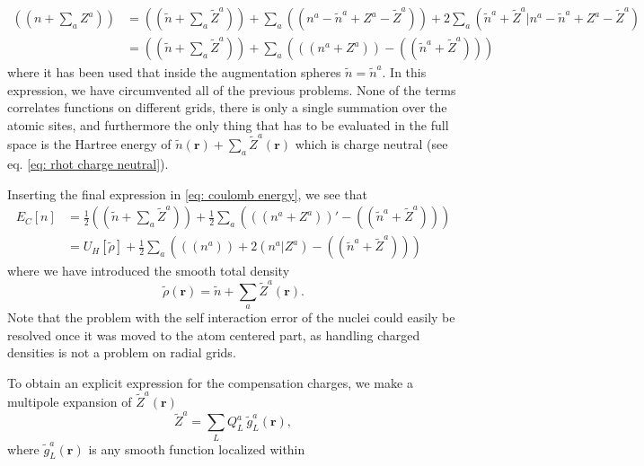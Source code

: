 \documentclass[a4paper]{article}
\newcommand{\s}[1]{\tilde{#1}}
\newcommand{\br}{\mathbf{r}}
\begin{document}
%
\begin{align*}
  ((n+\textstyle\sum_a Z^a)) %
  &= ((\s{n} + \textstyle\sum_a \s{Z}^a)) + \sum_{a}((n^a - \s{n}^a + Z^a - \s{Z}^a)) + 2\sum_a(\s{n}^a+\s{Z}^a|n^a - \s{n}^a + Z^a - \s{Z}^a)\\
  &= ((\s{n} + \textstyle\sum_a \s{Z}^a)) + \sum_{a}\left( ((n^a + Z^a)) - ((\s{n}^a + \s{Z}^a)) \right)
\end{align*}
%
where it has been used that inside the augmentation spheres $\s{n} =
\s{n}^a$. In this expression, we have circumvented all of the previous
problems. None of the terms correlates functions on different grids,
there is only a single summation over the atomic sites, and
furthermore the only thing that has to be evaluated in the full space
is the Hartree energy of $\s{n}(\br) + \sum_a \s{Z}^a(\br)$ which is
charge neutral (see eq. \ref{eq: rhot charge neutral}).
\par Inserting the final expression in \ref{eq: coulomb energy}, we see that
%
\begin{equation}
  \begin{split}
       E_C[n] &=  \frac{1}{2}((\s{n} + {\textstyle\sum_a} \s{Z}^a)) + \frac{1}{2}\sum_a \left(((n^a + Z^a))' - ((\s{n}^a + \s{Z}^a))\right)\\
              &=U_H[\s{\rho}] + \frac{1}{2}\sum_a \left( ((n^a)) + 2(n^a|Z^a) - ((\s{n}^a + \s{Z}^a))\right)
  \end{split}
\end{equation}
%
where we have introduced the smooth total density 
%
\begin{equation}
  \s{\rho}(\br) = \s{n} + \sum_a \s{Z}^a(\br).
\end{equation}
%
Note that the problem with the self interaction error of the nuclei
could easily be resolved once it was moved to the atom centered part,
as handling charged densities is not a problem on radial grids.
\par To obtain an explicit expression for the compensation charges, we
make a multipole expansion of $\s{Z}^a(\br)$
%
\begin{equation}\label{eq: compensation expansion}
  \s{Z}^a = \sum_L Q_L^a ~\s{g}_L^a(\br),
\end{equation}
%
where $\s{g}_L^a(\br)$ is any smooth function localized within
\end{document}
